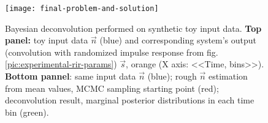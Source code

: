 \begin{figure}
	\centering
	\texttt{[image: final-problem-and-solution]}
	\caption{Bayesian deconvolution performed on synthetic toy input data. \textbf{Top panel:} toy input data $\vec{n}$ (blue) and corresponding system's output (convolution with randomized impulse response from fig. \ref{pic:experimental-rir-params}) $\vec{s}$, orange (X axis: <<Time, bins>>). \textbf{Bottom pannel}: same input data $\vec{n}$ (blue); rough $\vec{n}$ estimation from mean values, MCMC sampling starting point (red); deconvolution result, marginal posterior distributions in each time bin (green).}
	\label{pic:bayesian-deconvolution-with-experimantal-rir-and-rounding}
\end{figure}

